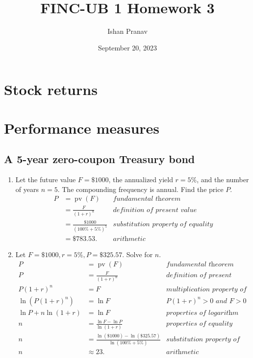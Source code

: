 \documentclass[12pt]{article}
\title{FINC-UB 1 Homework 3}
\author{Ishan Pranav}
\date{September 20, 2023}
\DeclareMathOperator{\pv}{pv}
\begin{document}
\maketitle
\section*{Stock returns}
\section*{Performance measures}
\subsection{A 5-year zero-coupon Treasury bond}
\begin{enumerate}
\item Let the future value $F=\$1000$, the annualized yield $r=5\%$, and the number of years $n=5$. The compounding frequency is annual. Find the price $P$.
\begin{align*}
P
&=\pv(F)&\textit{fundamental theorem}\\
&=\frac{F}{(1+r)^n}&\textit{definition of present value}\\
&=\frac{\$1000}{(100\%+5\%)^5}&\textit{substitution property of equality}\\
&=\$783.53.&\textit{arithmetic}
\end{align*}
\item Let $F=\$1000,r=5\%,P=\$325.57$. Solve for $n$.
\begin{align*}
P&=\pv(F)&\textit{fundamental theorem}\\
P&=\frac{F}{(1+r)^n}&\textit{definition of present value}\\
P(1+r)^n&=F&\textit{multiplication property of equality}\\
\ln\left(P(1+r)^n\right)&=\ln{F}&\textit{$P(1+r)^n>0$ and $F>0$}\\
\ln{P}+n\ln(1+r)&=\ln{F}&\textit{properties of logarithm}\\
n&=\frac{\ln{F}-\ln{P}}{\ln(1+r)}&\textit{properties of equality}\\
n&=\frac{\ln(\$1000)-\ln(\$325.57)}{\ln(100\%+5\%)}&\textit{substitution property of equality}\\
n&\approx 23.&\textit{arithmetic}
\end{align*}
\end{enumerate}
\end{document}
